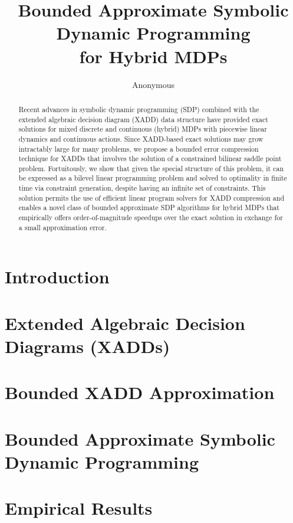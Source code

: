 \documentclass[]{article}
\title{	Bounded Approximate Symbolic Dynamic Programming\\ for Hybrid MDPs }
\author{Anonymous}
\begin{document}
\maketitle

\begin{abstract}
Recent advances in symbolic dynamic programming (SDP) combined with
the extended algebraic decision diagram (XADD) data structure have
provided exact solutions for mixed discrete and continuous (hybrid)
MDPs with piecewise linear dynamics and continuous actions.  Since
XADD-based exact solutions may grow intractably large for many
problems, we propose a bounded error compression technique for XADDs
that involves the solution of a constrained bilinear saddle point
problem.  Fortuitously, we show that given the special structure of
this problem, it can be expressed as a bilevel linear programming
problem and solved to optimality in finite time via constraint
generation, despite having an infinite set of constraints.  This
solution permits the use of efficient linear program solvers for XADD
compression and enables a novel class of bounded approximate SDP
algorithms for hybrid MDPs that empirically offers order-of-magnitude
speedups over the exact solution in exchange for a small approximation
error.
\end{abstract}

\section{Introduction}



\section{Extended Algebraic Decision Diagrams (XADDs)}



\section{Bounded XADD Approximation}



\section{Bounded Approximate Symbolic Dynamic Programming}



\section{Empirical Results}
\end{document}
